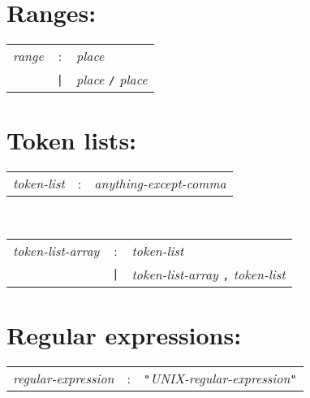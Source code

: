 \section*{Ranges:}
\begin{tabular}{p{4cm}cl}
\textit{range}
  &:& \textit{place} \\
  &\texttt{|}& \textit{place} \texttt{/} \textit{place}
\end{tabular}

\section*{Token lists:}
\begin{tabular}{p{4cm}cl}
\textit{token-list}
  &:& \textit{anything-except-comma}
\end{tabular}
\\
\begin{tabular}{p{4cm}cl}
\textit{token-list-array}
  &:& \textit{token-list} \\
  &\texttt{|}& \textit{token-list-array} \texttt{,} \textit{token-list}
\end{tabular}

\section*{Regular expressions:}
\begin{tabular}{p{4cm}cl}
\textit{regular-expression}
  &:& \texttt{"}\textit{UNIX-regular-expression}\texttt{"}
\end{tabular}
